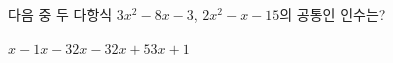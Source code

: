 다음 중 두 다항식 $3x^2-8x-3$, $2x^2-x-15$의 공통인 인수는?
\begin{choices32}{$x-1$}{$x-3$}{$2x-3$}{$2x+5$}{$3x+1$}\end{choices32}
